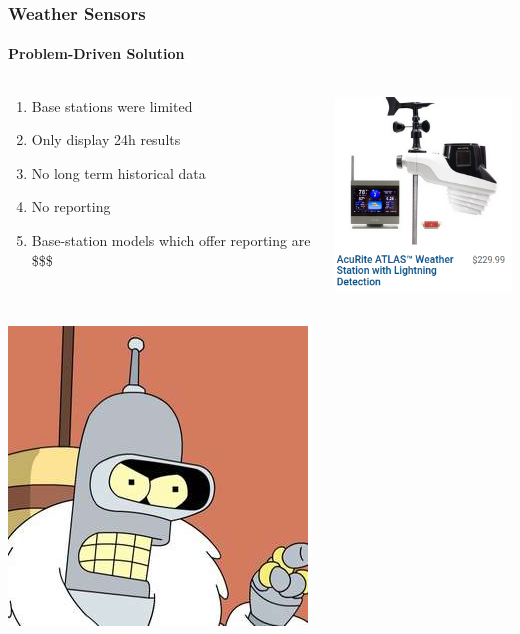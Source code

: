 \documentclass[aspectratio=169]{beamer}
\begin{document}
\begin{frame}[fragile]
  \frametitle{Weather Sensors}
  \framesubtitle{Problem-Driven Solution}
  \begin{columns}[T]
    \begin{column}[T]{0.5\paperwidth}
      \begin{enumerate}
        \item{Base stations were limited}
        \item{Only display 24h results}
        \item{No long term historical data}
        \item{No reporting}
        \item{Base-station models which offer reporting are \$\$\$}
      \end{enumerate}
    \end{column}
    \begin{column}[T]{0.45\paperwidth}
      \includegraphics[width=5cm]{images/expensive.png}
    \end{column}
  \end{columns}
\end{frame}

\begin{frame}[fragile]
  \begin{center}
  \includegraphics[height=0.75\paperheight]{images/bender.jpg}
  \end{center}
\end{frame}
\end{document}
